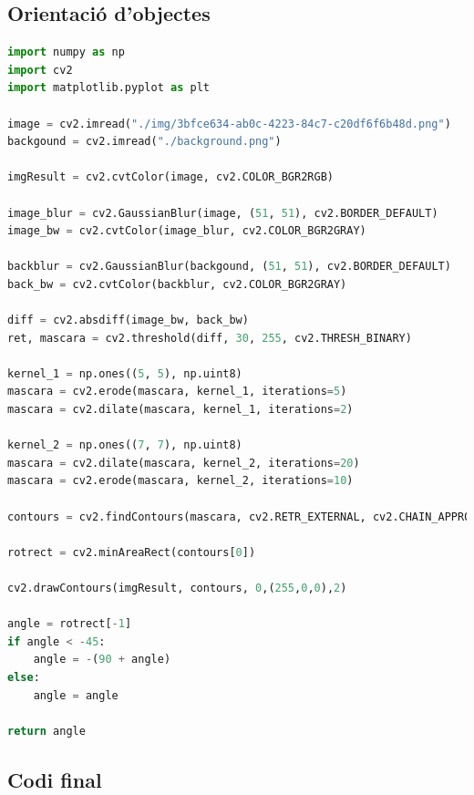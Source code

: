 ﻿\documentclass[10pt,a4paper,twocolumn,twoside]{article}
\begin{document}
\subsection{Orientació d'objectes}
\begin{lstlisting}[language=Python]
import numpy as np
import cv2
import matplotlib.pyplot as plt

image = cv2.imread("./img/3bfce634-ab0c-4223-84c7-c20df6f6b48d.png")
backgound = cv2.imread("./background.png")

imgResult = cv2.cvtColor(image, cv2.COLOR_BGR2RGB)

image_blur = cv2.GaussianBlur(image, (51, 51), cv2.BORDER_DEFAULT)
image_bw = cv2.cvtColor(image_blur, cv2.COLOR_BGR2GRAY)

backblur = cv2.GaussianBlur(backgound, (51, 51), cv2.BORDER_DEFAULT)
back_bw = cv2.cvtColor(backblur, cv2.COLOR_BGR2GRAY)

diff = cv2.absdiff(image_bw, back_bw)
ret, mascara = cv2.threshold(diff, 30, 255, cv2.THRESH_BINARY)

kernel_1 = np.ones((5, 5), np.uint8)
mascara = cv2.erode(mascara, kernel_1, iterations=5)
mascara = cv2.dilate(mascara, kernel_1, iterations=2)

kernel_2 = np.ones((7, 7), np.uint8)
mascara = cv2.dilate(mascara, kernel_2, iterations=20)
mascara = cv2.erode(mascara, kernel_2, iterations=10)

contours = cv2.findContours(mascara, cv2.RETR_EXTERNAL, cv2.CHAIN_APPROX_SIMPLE)[-2]

rotrect = cv2.minAreaRect(contours[0])

cv2.drawContours(imgResult, contours, 0,(255,0,0),2)

angle = rotrect[-1]
if angle < -45:
    angle = -(90 + angle)
else:
    angle = angle

return angle

\end{lstlisting}

\subsection{Codi final}
\end{document}
